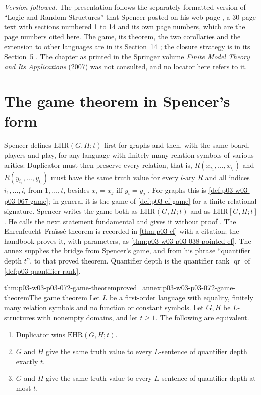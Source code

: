 \emph{Version followed.} The presentation follows the separately formatted
version of ``Logic and Random Structures'' that Spencer posted on his web
page \cite{Spencer2007LogicRandomStructuresAuthor}, a
30-page text with sections numbered 1 to 14 and its own page numbers, which
are the page numbers cited here.  The game, its theorem, the two
corollaries and the extension to other languages are in its Section~14
\cite[pp.~26--27]{Spencer2007LogicRandomStructuresAuthor}; the closure
strategy is in its Section~5
\cite[pp.~11--12]{Spencer2007LogicRandomStructuresAuthor}.  The chapter as
printed in the Springer volume \emph{Finite Model Theory and Its
Applications} (2007) was not consulted, and no locator here refers to it.

\section{The game theorem in Spencer's form}
\label{sec:p03-w03-p03-072-theorem}

Spencer defines \(\mathrm{EHR}(G,H;t)\) first for graphs and then, with the
same board, players and play, for any language with finitely many relation
symbols of various arities: Duplicator must then preserve every relation,
that is, \(R(x_{i_1},\ldots,x_{i_l})\) and \(R(y_{i_1},\ldots,y_{i_l})\)
must have the same truth value for every \(l\)-ary \(R\) and all indices
\(i_1,\ldots,i_l\) from \(1,\ldots,t\), besides \(x_i=x_j\) iff
\(y_i=y_j\) \cite[pp.~26--27]{Spencer2007LogicRandomStructuresAuthor}.
For graphs this is \cref{def:p03-w03-p03-067-game}; in general it is the
game of \cref{def:p03-ef-game} for a finite relational signature.  Spencer
writes the game both as \(\mathrm{EHR}(G,H;t)\) and as
\(\mathrm{EHR}[G,H;t]\).  He calls the next statement fundamental and gives
it without proof \cite[pp.~26--27]{Spencer2007LogicRandomStructuresAuthor}.
The Ehrenfeucht--Fra\"iss\'e theorem is recorded in
\cref{thm:p03-ef} with a citation; the handbook proves it, with parameters,
as \cref{thm:p03-w03-p03-038-pointed-ef}.  The annex supplies the bridge
from Spencer's game, and from his phrase ``quantifier depth \(t\)'', to that
proved theorem.  Quantifier depth is the quantifier rank
\(\operatorname{qr}\) of \cref{def:p03-quantifier-rank}.

\begin{hbtheorem}{thm:p03-w03-p03-072-game-theorem}{proved=annex:p03-w03-p03-072-game-theorem}{The game theorem}
Let \(L\) be a first-order language with equality, finitely many relation
symbols and no function or constant symbols.  Let \(G,H\) be
\(L\)-structures with nonempty domains, and let \(t\geq1\).  The following
are equivalent.
\begin{enumerate}
\item Duplicator wins \(\mathrm{EHR}(G,H;t)\).
\item \(G\) and \(H\) give the same truth value to every \(L\)-sentence of
  quantifier depth exactly \(t\).
\item \(G\) and \(H\) give the same truth value to every \(L\)-sentence of
  quantifier depth at most \(t\).
\end{enumerate}
\end{hbtheorem}

